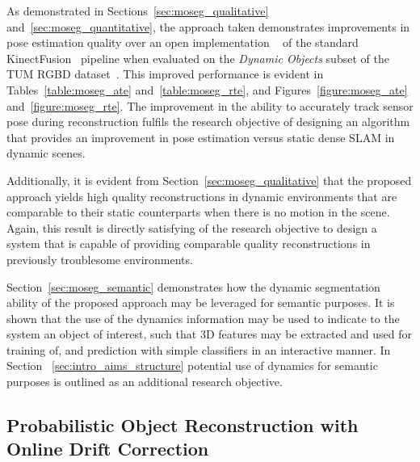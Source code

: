 As demonstrated in Sections~\ref{sec:moseg_qualitative} and~\ref{sec:moseg_quantitative}, the 
approach taken demonstrates improvements in pose estimation quality over an open implementation
~\cite{Prisacariu2014} of the standard KinectFusion~\cite{Newcombe2011} pipeline when evaluated 
on the \textit{Dynamic Objects} subset of the TUM RGBD dataset~\cite{Sturm2012}. This improved 
performance is evident in Tables~\ref{table:moseg_ate} and~\ref{table:moseg_rte}, and 
Figures~\ref{figure:moseg_ate} and~\ref{figure:moseg_rte}. The improvement in the ability to 
accurately track sensor pose during reconstruction fulfils the research objective of designing 
an algorithm that provides an improvement in pose estimation versus static dense SLAM in dynamic 
scenes.

Additionally, it is evident from Section~\ref{sec:moseg_qualitative} that the proposed approach 
yields high quality reconstructions in dynamic environments that are comparable to their static 
counterparts when there is no motion in the scene. Again, this result is directly satisfying of 
the research objective to design a system that is capable of providing comparable quality 
reconstructions in previously troublesome environments.

Section~\ref{sec:moseg_semantic} demonstrates how the dynamic segmentation ability of the proposed 
approach may be leveraged for semantic purposes. It is shown that the use of the dynamics information 
may be used to indicate to the system an object of interest, such that 3D features may be extracted 
and used for training of, and prediction with simple classifiers in an interactive manner. In Section
~\ref{sec:intro_aims_structure} potential use of dynamics for semantic purposes is outlined as an 
additional research objective.



\subsection{Probabilistic Object Reconstruction with Online Drift Correction}
~\label{subsec:discussion_probobj}

